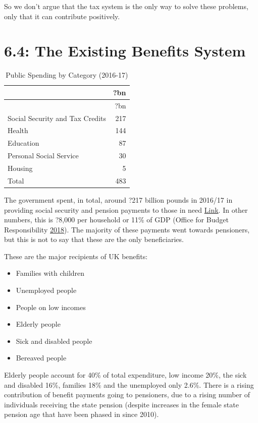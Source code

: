 \documentclass[]{tufte-handout}
\providecommand{\tightlist}{%
  \setlength{\itemsep}{0pt}\setlength{\parskip}{0pt}}
\begin{document}
So we don't argue that the tax system is the only way to solve these
problems, only that it can contribute positively.

\hypertarget{the-existing-benefits-system}{%
\section{6.4: The Existing Benefits
System}\label{the-existing-benefits-system}}

\begin{longtable}[]{@{}lr@{}}
\caption{Public Spending by Category (2016-17)}\tabularnewline
\toprule
& ?bn\tabularnewline
\midrule
\endfirsthead
\toprule
& ?bn\tabularnewline
\midrule
\endhead
Social Security and Tax Credits & 217\tabularnewline
Health & 144\tabularnewline
Education & 87\tabularnewline
Personal Social Service & 30\tabularnewline
Housing & 5\tabularnewline
Total & 483\tabularnewline
\bottomrule
\end{longtable}

The government spent, in total, around ?217 billion pounds in 2016/17 in
providing social security and pension payments to those in need
\href{http://obr.uk/docs/dlm_uploads/An-OBR-guide-to-welfare-spending-March-2018.pdf}{Link}.
In other numbers, this is ?8,000 per household or 11\% of GDP (Office
for Budget Responsibility \protect\hyperlink{ref-OBR2018}{2018}). The
majority of these payments went towards pensioners, but this is not to
say that these are the only beneficiaries.

These are the major recipients of UK benefits:

\begin{itemize}
\tightlist
\item
  Families with children
\item
  Unemployed people
\item
  People on low incomes
\item
  Elderly people
\item
  Sick and disabled people
\item
  Bereaved people
\end{itemize}

Elderly people account for 40\% of total expenditure, low income 20\%,
the sick and disabled 16\%, families 18\% and the unemployed only 2.6\%.
There is a rising contribution of benefit payments going to pensioners,
due to a rising number of individuals receiving the state pension
(despite increases in the female state pension age that have been phased
in since 2010).
\end{document}
